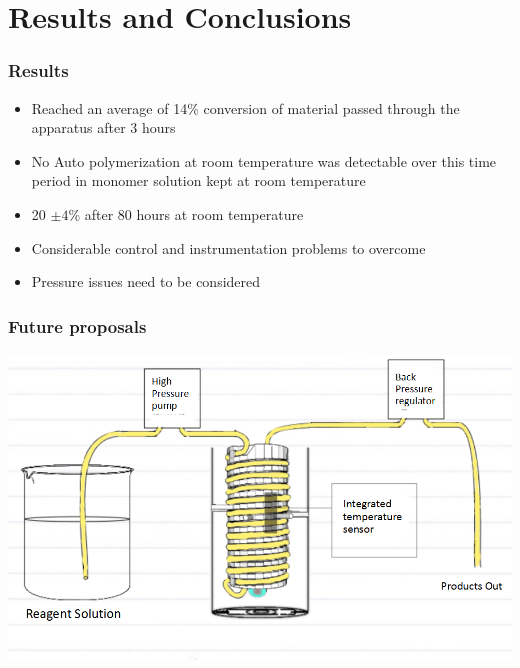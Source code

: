 \documentclass[10pt, compress]{beamer}
\begin{document}
\section{Results and Conclusions}

\begin{frame}
\frametitle{Results}
\begin{itemize}
    \item {Reached an average of 14\% conversion of material passed through the apparatus after 3 hours}
    \item {No Auto polymerization at room temperature was detectable over this time period in  monomer solution kept at room temperature}
    \item { 20 $\pm 4$\% after 80 hours at room temperature}
    \item { Considerable control and instrumentation problems to overcome}
    \item { Pressure issues need to be considered}
\end{itemize}
\end{frame}

\begin{frame}
\frametitle{Future proposals}
\begin{center}
\includegraphics[width=\textwidth]{suggestedimp.png}
\end{center}

\end{frame}
\end{document}
